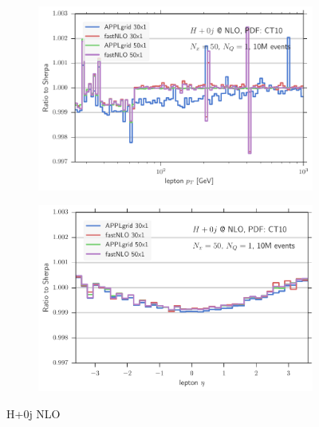 \begin{figure}
\begin{subfigure}[]{0.49\textwidth}
	\includegraphics[width=\textwidth]{images/hnlo_lpt_50v30.pdf}
\end{subfigure}
\hfill
\begin{subfigure}[]{0.49\textwidth}
	\includegraphics[width=\textwidth]{images/hnlo_leta_50v30.pdf}
\end{subfigure}
\caption{H+0j NLO}
\label{fig:hnlo_validation}
\end{figure}
%


